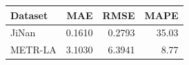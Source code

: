\begingroup\color{revisionblue}
\sffamily\fontsize{9}{11}\selectfont\renewcommand{\arraystretch}{1.08}\setlength{\tabcolsep}{3pt}
\begin{tabular}{lrrr}\toprule
Dataset & MAE & RMSE & MAPE \\ \midrule
JiNan & 0.1610 & 0.2793 & 35.03 \\
METR-LA & 3.1030 & 6.3941 & 8.77 \\
\bottomrule\end{tabular}
\endgroup
